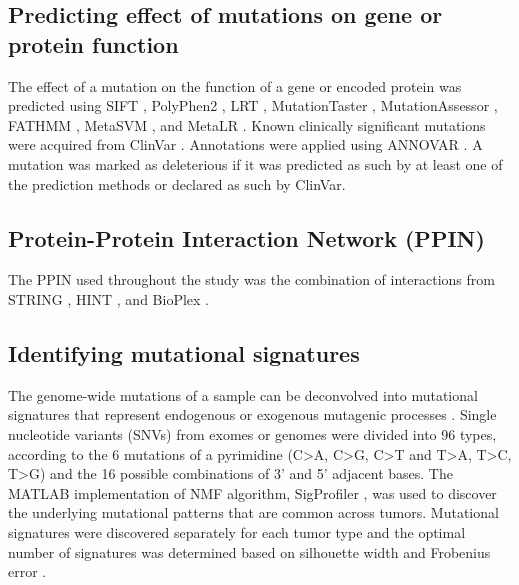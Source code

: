 \documentclass[english, 10pt, letterpaper]{article}
\begin{document}
\subsection*{Predicting effect of mutations on gene or protein function}

The effect of a mutation on the function of a gene or encoded protein was predicted using SIFT \cite{Kumar2009, Vaser2016}, PolyPhen2 \cite{Adzhubei2010}, LRT \cite{Chun2009IdentificationGenomes.}, MutationTaster \cite{Schwarz2014MutationTaster2:Age.}, MutationAssessor \cite{Reva2007DeterminantsOptimization., Reva2011}, FATHMM \cite{Shihab2013}, MetaSVM \cite{Dong2015ComparisonStudies.}, and MetaLR \cite{Dong2015ComparisonStudies.}.
Known clinically significant mutations were acquired from ClinVar \cite{Landrum2018ClinVar:Evidence.}.
Annotations were applied using ANNOVAR \cite{Wang2010ANNOVAR:Data.}.
A mutation was marked as deleterious if it was predicted as such by at least one of the prediction methods or declared as such by ClinVar.


\subsection*{Protein-Protein Interaction Network (PPIN)}

The PPIN used throughout the study was the combination of interactions from STRING \cite{VonMering2005, Szklarczyk2019}, HINT \cite{Das2012}, and BioPlex \cite{Huttlin2015}.


\subsection*{Identifying mutational signatures}

The genome-wide mutations of a sample can be deconvolved into mutational signatures that represent endogenous or exogenous mutagenic processes \cite{Alexandrov2013}. 
Single nucleotide variants (SNVs) from exomes or genomes were divided into 96 types, according to the 6 mutations of a pyrimidine (C>A, C>G, C>T and T>A, T>C, T>G) and the 16 possible combinations of 3’ and 5’ adjacent bases.
The MATLAB \cite{MATLAB:2010} implementation of NMF algorithm, SigProfiler \cite{Alexandrov2013}, was used to discover the underlying mutational patterns that are common across tumors. 
Mutational signatures were discovered separately for each tumor type and the optimal number of signatures was determined based on silhouette width and Frobenius error \cite{Alexandrov2013DecipheringCancer.}.
\end{document}

